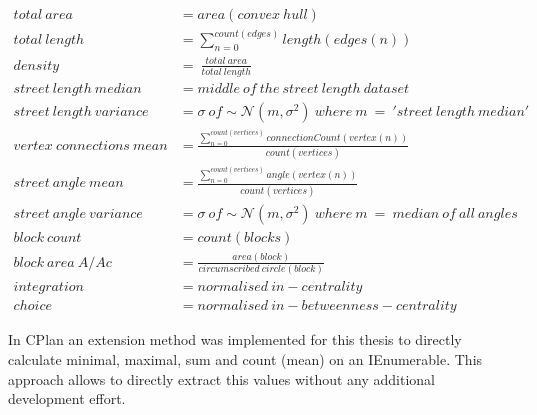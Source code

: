 \begin{align}
    total\ area &= area(convex\ hull)  \\
    total\ length &= \sum_{n=0}^{count(edges)} length(edges(n))\  \\
    density &=\ \frac{total\ area}{total\ length} \\
    street\ length\ median &=  middle\ of\ the\ street\ length\ dataset \\
    street\ length\ variance &= \sigma\ of \sim\mathcal{N}(m,\sigma^2)\ where\ m\ =\ 'street\ length\ median' \\
    vertex\ connections\ mean &= \frac{\sum_{n=0}^{count(vertices)} connectionCount(vertex(n))}{count(vertices)} \\
    street\ angle\ mean &= \frac{\sum_{n=0}^{count(vertices)} angle(vertex(n))}{count(vertices)} \\
    street\ angle\ variance &= \sigma\ of \sim\mathcal{N}(m,\sigma^2)\ where\ m\ =\ median\ of\ all\ angles \\
    block\ count &= count(blocks) \\
    block\ area\ A/Ac &= \frac{area(block)}{circumscribed\ circle(block)} \\
    integration &= normalised\ in-centrality \\
    choice &= normalised\ in-betweenness-centrality 
\end{align}

In CPlan an extension method was implemented for this thesis to directly calculate minimal, maximal, sum and count (mean) on an IEnumerable. This approach allows to directly extract this values without any additional development effort. 
